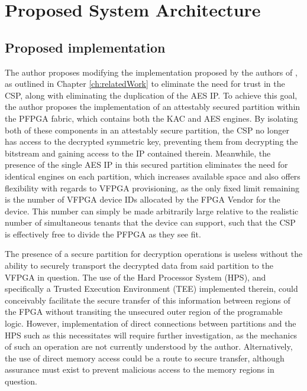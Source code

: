 
\chapter{Proposed System Architecture}\label{ch:systemArchitecture}

\section{Proposed implementation}\label{subsec:Proposal}
The author proposes modifying the implementation proposed by the authors of \cite{bag_cryptographically_2020}, as outlined in Chapter \ref{ch:relatedWork} to eliminate the need for trust in the CSP, along with eliminating the duplication of the AES IP. To achieve this goal, the author proposes the implementation of an attestably secured partition within the PFPGA fabric, which contains both the KAC and AES engines. By isolating both of these components in an attestably secure partition, the CSP no longer has access to the decrypted symmetric key, preventing them from decrypting the bitstream and gaining access to the IP contained therein. Meanwhile, the presence of the single AES IP in this secured partition eliminates the need for identical engines on each partition, which increases available space and also offers flexibility with regards to VFPGA provisioning, as the only fixed limit remaining is the number of VFPGA device IDs allocated by the FPGA Vendor for the device. This number can simply be made arbitrarily large relative to the realistic number of simultaneous tenants that the device can support, such that the CSP is effectively free to divide the PFPGA as they see fit.

The presence of a secure partition for decryption operations is useless without the ability to securely transport the decrypted data from said partition to the VFPGA in question. The use of the Hard Processor System (HPS), and specifically a Trusted Execution Environment (TEE) implemented therein, could conceivably facilitate the secure transfer of this information between regions of the FPGA without transiting the unsecured outer region of the programable logic. However, implementation of direct connections between partitions and the HPS such as this necessitates will require further investigation, as the mechanics of such an operation are not currently understood by the author. Alternatively, the use of direct memory access could be a route to secure transfer, although assurance must exist to prevent malicious access to the memory regions in question.

